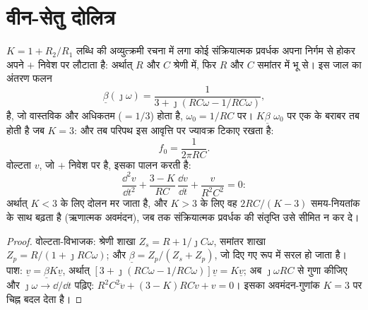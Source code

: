 \section{वीन-सेतु दोलित्र}

\begin{proposition}[वीन-सेतु दोलित्र]\label{prop:b2:feedback-oscillators:wien}
$K = 1 + R_2/R_1$ लब्धि की अव्युत्क्रमी रचना में लगा कोई संक्रियात्मक प्रवर्धक
अपना निर्गम \emph{} से होकर अपने $+$ निवेश पर लौटाता है:
अर्थात् $R$ और $C$ श्रेणी में, फिर $R$ और $C$ समांतर में भू से। इस
जाल का अंतरण फलन
\[
\underline\beta(\jmath\omega) = \frac1{3 + \jmath(RC\omega - 1/RC\omega)} ,
\]
है, जो वास्तविक और अधिकतम ($= 1/3$) होता है, $\omega_0 = 1/RC$ पर।  $K\underline\beta$
$\omega_0$ पर एक के बराबर तब होती है जब $K = 3$: और तब परिपथ इस आवृत्ति पर
ज्यावक्र टिकाए रखता है:
\[
f_0 = \frac1{2\pi RC} .
\]
वोल्टता $v$, जो $+$ निवेश पर है, इसका पालन करती है:
\[
\frac{\dd^2v}{\dd t^2} + \frac{3 - K}{RC}\,\frac{\dd v}{\dd t} + \frac{v}{R^2C^2} = 0 :
\]
अर्थात् $K < 3$ के लिए दोलन मर जाता है, और $K > 3$ के लिए वह $2RC/(K - 3)$
समय-नियतांक के साथ बढ़ता है (ऋणात्मक अवमंदन), जब तक संक्रियात्मक प्रवर्धक की
संतृप्ति उसे सीमित न कर दे।
\end{proposition}

\begin{proof}
वोल्टता-विभाजक: श्रेणी शाखा $Z_s = R + 1/\jmath C\omega$, समांतर
शाखा $Z_p = R/(1 + \jmath RC\omega)$; और $\underline\beta = Z_p/(Z_s + Z_p)$, जो
दिए गए रूप में सरल हो जाता है। पाश: $\underline v = \underline\beta K\underline v$, अर्थात्
$[3 + \jmath(RC\omega - 1/RC\omega)]\underline v = K\underline v$; अब $\jmath\omega RC$ से गुणा कीजिए
और $\jmath\omega \to \dd/\dd t$ पढ़िए: $R^2C^2\ddot v + (3 - K)RC\dot v + v = 0$।
इसका अवमंदन-गुणांक $K = 3$ पर चिह्न बदल देता है।
\end{proof}

